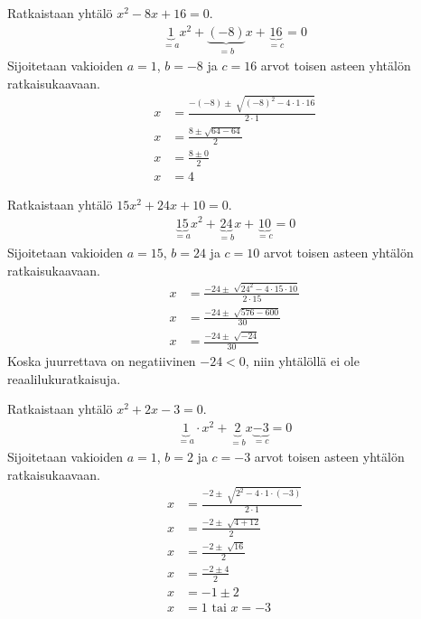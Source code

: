 \begin{esimerkki}
Ratkaistaan yhtälö $x^2-8x+16=0$.
\begin{align*}
\underbrace{1}_{=a}x^2 +\underbrace{(-8)}_{=b}x+\underbrace{16}_{=c}=0
\end{align*}
Sijoitetaan vakioiden $a=1$, $b=-8$ ja $c=16$ arvot toisen asteen yhtälön
ratkaisukaavaan.
\begin{align*}
x&=\frac{-(-8)\pm \sqrt[]{(-8)^2-4\cdot 1 \cdot 16}}{2 \cdot 1} \\
x&=\frac{8 \pm \sqrt{64- 64}}{2} \\
x&=\frac{8 \pm 0}{2} \\
x&=4
\end{align*}
\end{esimerkki}

\begin{esimerkki}
Ratkaistaan yhtälö $15x^2+24x+10=0$.
\begin{align*}
\underbrace{15}_{=a}x^2+\underbrace{24}_{=b}x+\underbrace{10}_{=c}=0
\end{align*}
Sijoitetaan vakioiden $a=15$, $b=24$ ja $c=10$ arvot toisen asteen yhtälön ratkaisukaavaan.
\begin{align*}
x&=\frac{-24 \pm \sqrt[]{24^2-4 \cdot 15 \cdot 10}}{2 \cdot 15} \\
x&=\frac{-24 \pm \sqrt[]{576-600}}{30} \\
x&=\frac{-24 \pm \sqrt[]{-24}}{30}
\end{align*}
Koska juurrettava on negatiivinen $-24<0$, niin yhtälöllä ei ole reaalilukuratkaisuja. \\
\end{esimerkki}

\begin{esimerkki}
Ratkaistaan yhtälö $x^2+2x-3=0$.
\begin{align*}
\underbrace{1}_{=a} \cdot x^2+\underbrace{2}_{=b}x\underbrace{-3}_{=c}=0
\end{align*}
Sijoitetaan vakioiden $a=1$, $b=2$ ja $c=-3$ arvot toisen asteen yhtälön ratkaisukaavaan.
\begin{align*}
x&=\frac{-2 \pm \sqrt[]{2^2-4 \cdot 1 \cdot (-3)}}{2 \cdot 1} \\
x&=\frac{-2 \pm \sqrt[]{4+12}}{2} \\
x&=\frac{-2 \pm \sqrt[]{16}}{2} \\
x&=\frac{-2 \pm 4}{2} \\
x&=-1 \pm 2 \\
x&=1 \text{ tai } x=-3 \\
\end{align*}
\end{esimerkki}

